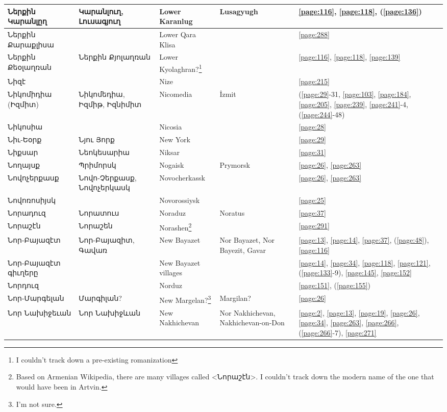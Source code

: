 \begin{center}
\begin{longtable}{|p{}|p{3cm}|p{3cm}|p{2cm}|p{3cm}|}
Ներքին Կարանլըղ&Կարանլուղ, Լուսագյուղ   & Lower Karanlug &  Lusagyugh &\ref{page:116}, \ref{page:118}, (\ref{page:136})\\ \hline
Ներքին Քարաքլիսա& &Lower Qara Klisa & &\ref{page:288}\\ \hline
Ներքին Քեօլաղռան&Ներքին Քյոլաղռան & Lower Kyolaghran?\footnote{I couldn't track down a pre-existing romanization} &&\ref{page:116}, \ref{page:118}, \ref{page:139}\\ \hline
Նիզէ& &Nize & &\ref{page:215}\\ \hline
Նիկոմիդիա (Իզմիտ)& Նիկոմեդիա, Իզմիթ, Իզնիմիտ&  Nicomedia  & İzmit&(\ref{page:29}-31, \ref{page:103}, \ref{page:184}, \ref{page:205}, \ref{page:239}, \ref{page:241}-4, (\ref{page:244}-48)\\ \hline
Նիկոսիա& &Nicosia & &\ref{page:28}\\ \hline
Նիւ-Եօրք& Նյու Յորք& New York& &\ref{page:29}\\ \hline
Նիքսար& Նեոկեսարիա&Niksar  & &\ref{page:31}\\ \hline
Նողայսք&Պրիմորսկ &Nogaisk &Prymorsk &\ref{page:26}, \ref{page:263}\\ \hline
Նովոչերքասք&Նովո-Չերքասք, Նովոչերկասկ & Novocherkassk& &\ref{page:26}, \ref{page:263}\\ \hline
Նովոռոսիյսկ& &Novorossiysk & &\ref{page:25}\\ \hline
Նորադուզ&  Նորատուս  &Noraduz &Noratus &\ref{page:37}\\ \hline
Նորաշէն& Նորաշեն&Norashen\footnote{Based on Armenian Wikipedia, there are many villages called <Նորաշէն>. I couldn't track down the modern name of the one that would have been in Artvin.  }     & &\ref{page:291}\\ \hline
Նոր-Բայազէտ& Նոր-Բայազիտ, Գավառ& New Bayazet&Nor Bayazet, Nor Bayezit, Gavar &\ref{page:13}, \ref{page:14}, \ref{page:37}, (\ref{page:48}), \ref{page:116}\\ \hline
Նոր-Բայազէտ գիւղերը& &New Bayazet villages & &\ref{page:14}, \ref{page:34}, \ref{page:118}, \ref{page:121}, (\ref{page:133}-9), \ref{page:145}, \ref{page:152}\\ \hline
Նորդուզ& &Norduz & &\ref{page:151}, (\ref{page:155})\\ \hline
Նոր-Մարգելան& Մարգիլան?& New Margelan?\footnote{I'm not sure.}& Margilan?&\ref{page:26}\\ \hline
Նոր Նախիջեւան& Նոր Նախիջևան&New Nakhichevan &Nor Nakhichevan,  Nakhichevan-on-Don&\ref{page:2}, \ref{page:13}, \ref{page:19}, \ref{page:26}, \ref{page:34}, \ref{page:263}, \ref{page:266}, (\ref{page:266}-7), \ref{page:271}\\ \hline

\end{longtable}
\end{center}

